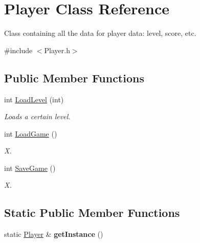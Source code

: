 \hypertarget{class_player}{}\section{Player Class Reference}
\label{class_player}


Class containing all the data for player data\+: level, score, etc.  




{\ttfamily \#include $<$Player.\+h$>$}

\subsection*{Public Member Functions}
\begin{DoxyCompactItemize}
\item 
int \hyperlink{class_player_ad0ad39f2def9706f640756bfa18325b9}{Load\+Level} (int)
\begin{DoxyCompactList}\small\item\em Loads a certain level. \end{DoxyCompactList}\item 
int \hyperlink{class_player_a7d6d5ae271d5a9897f9e2aae65184dac}{Load\+Game} ()
\begin{DoxyCompactList}\small\item\em X. \end{DoxyCompactList}\item 
int \hyperlink{class_player_a39b5ad5853752cfce82e54b67c2e57e7}{Save\+Game} ()
\begin{DoxyCompactList}\small\item\em X. \end{DoxyCompactList}\end{DoxyCompactItemize}
\subsection*{Static Public Member Functions}
\begin{DoxyCompactItemize}
\item 
\mbox{\label{class_player_a676c1467083571da9294cff54a0e6f1d}} 
static \hyperlink{class_player}{Player} \& {\bfseries get\+Instance} ()
\end{DoxyCompactItemize}
